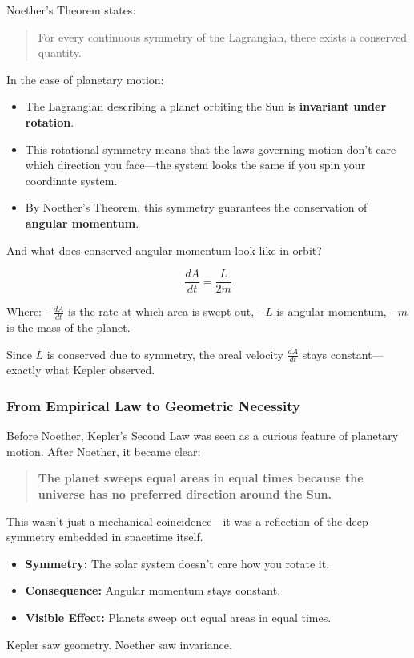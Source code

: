 Noether’s Theorem states:

\begin{quote}
For every continuous symmetry of the Lagrangian, there exists a conserved quantity.
\end{quote}

In the case of planetary motion:

\begin{itemize}
  \item The Lagrangian describing a planet orbiting the Sun is \textbf{invariant under rotation}.
  \item This rotational symmetry means that the laws governing motion don’t care which direction you face—the system looks the same if you spin your coordinate system.
  \item By Noether’s Theorem, this symmetry guarantees the conservation of \textbf{angular momentum}.
\end{itemize}

And what does conserved angular momentum look like in orbit?

\[
\frac{dA}{dt} = \frac{L}{2m}
\]

Where:
- \( \frac{dA}{dt} \) is the rate at which area is swept out,
- \( L \) is angular momentum,
- \( m \) is the mass of the planet.

Since \( L \) is conserved due to symmetry, the areal velocity \( \frac{dA}{dt} \) stays constant—exactly what Kepler observed.

\subsubsection*{From Empirical Law to Geometric Necessity}

Before Noether, Kepler’s Second Law was seen as a curious feature of planetary motion. After Noether, it became clear:

\begin{quote}
\textbf{The planet sweeps equal areas in equal times because the universe has no preferred direction around the Sun.}
\end{quote}

This wasn’t just a mechanical coincidence—it was a reflection of the deep symmetry embedded in spacetime itself.

\begin{tcolorbox}[colback=blue!5!white, colframe=blue!50!black, title={Kepler’s Second Law: A Noetherian Perspective}]
\begin{itemize}
  \item \textbf{Symmetry:} The solar system doesn’t care how you rotate it.
  \item \textbf{Consequence:} Angular momentum stays constant.
  \item \textbf{Visible Effect:} Planets sweep out equal areas in equal times.
\end{itemize}

Kepler saw geometry.  
Noether saw invariance.
\end{tcolorbox}

